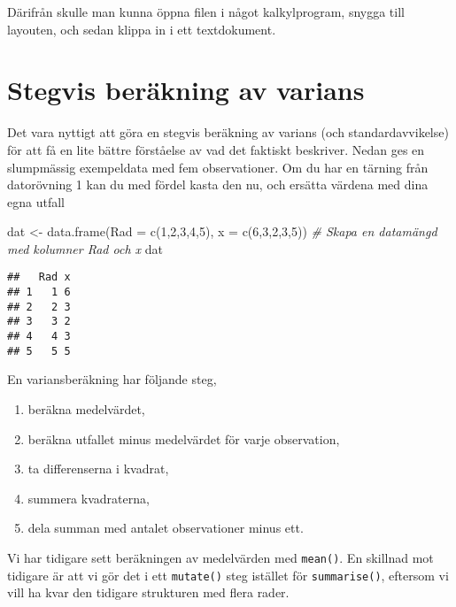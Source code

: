 \documentclass[
]{book}
\newenvironment{Shaded}{\begin{snugshade}}{\end{snugshade}}
\newcommand{\AttributeTok}[1]{\textcolor[rgb]{0.77,0.63,0.00}{#1}}
\newcommand{\CommentTok}[1]{\textcolor[rgb]{0.56,0.35,0.01}{\textit{#1}}}
\newcommand{\DecValTok}[1]{\textcolor[rgb]{0.00,0.00,0.81}{#1}}
\newcommand{\FunctionTok}[1]{\textcolor[rgb]{0.00,0.00,0.00}{#1}}
\newcommand{\NormalTok}[1]{#1}
\newcommand{\OtherTok}[1]{\textcolor[rgb]{0.56,0.35,0.01}{#1}}
\providecommand{\tightlist}{%
  \setlength{\itemsep}{0pt}\setlength{\parskip}{0pt}}
\theoremstyle{definition}
\theoremstyle{definition}
\theoremstyle{definition}
\theoremstyle{definition}
\theoremstyle{remark}
\begin{document}
Därifrån skulle man kunna öppna filen i något kalkylprogram, snygga till layouten, och sedan klippa in i ett textdokument.

\hypertarget{stegvis-beruxe4kning-av-varians}{%
\section{Stegvis beräkning av varians}\label{stegvis-beruxe4kning-av-varians}}

Det vara nyttigt att göra en stegvis beräkning av varians (och standardavvikelse) för att få en lite bättre förståelse av vad det faktiskt beskriver. Nedan ges en slumpmässig exempeldata med fem observationer. Om du har en tärning från datorövning 1 kan du med fördel kasta den nu, och ersätta värdena med dina egna utfall

\begin{Shaded}
\begin{Highlighting}[]
\NormalTok{dat }\OtherTok{\textless{}{-}} \FunctionTok{data.frame}\NormalTok{(}\AttributeTok{Rad =} \FunctionTok{c}\NormalTok{(}\DecValTok{1}\NormalTok{,}\DecValTok{2}\NormalTok{,}\DecValTok{3}\NormalTok{,}\DecValTok{4}\NormalTok{,}\DecValTok{5}\NormalTok{), }\AttributeTok{x =} \FunctionTok{c}\NormalTok{(}\DecValTok{6}\NormalTok{,}\DecValTok{3}\NormalTok{,}\DecValTok{2}\NormalTok{,}\DecValTok{3}\NormalTok{,}\DecValTok{5}\NormalTok{))    }\CommentTok{\# Skapa en datamängd med kolumner Rad och x}
\NormalTok{dat}
\end{Highlighting}
\end{Shaded}

\begin{verbatim}
##   Rad x
## 1   1 6
## 2   2 3
## 3   3 2
## 4   4 3
## 5   5 5
\end{verbatim}

En variansberäkning har följande steg,

\begin{enumerate}
\def\labelenumi{\arabic{enumi}.}
\tightlist
\item
  beräkna medelvärdet,
\item
  beräkna utfallet minus medelvärdet för varje observation,
\item
  ta differenserna i kvadrat,
\item
  summera kvadraterna,
\item
  dela summan med antalet observationer minus ett.
\end{enumerate}

Vi har tidigare sett beräkningen av medelvärden med \texttt{mean()}. En skillnad mot tidigare är att vi gör det i ett \texttt{mutate()} steg istället för \texttt{summarise()}, eftersom vi vill ha kvar den tidigare strukturen med flera rader.
\end{document}
